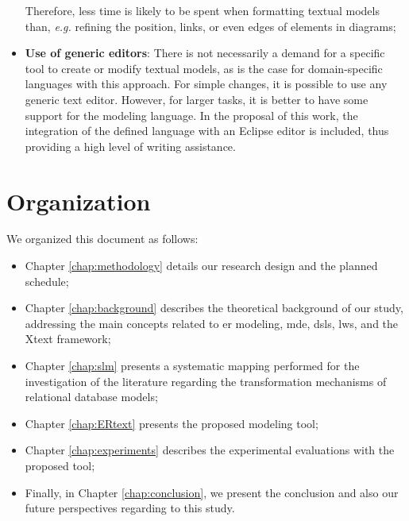 \begin{itemize}
    Therefore, less time is likely to be spent when formatting textual models than, \textit{e.g.} refining the position, links, or even edges of elements in diagrams;
    \item \textbf{Use of generic editors}: 
    There is not necessarily a demand for a specific tool to create or modify textual models, as is the case for domain-specific languages with this approach.
    For simple changes, it is possible to use any generic text editor.
    However, for larger tasks, it is better to have some support for the modeling language.
    In the proposal of this work, the integration of the defined language with an Eclipse editor is included, thus providing a high level of writing assistance.
\end{itemize}

\section{Organization}

We organized this document as follows:

\begin{itemize}
    \item Chapter \ref{chap:methodology} details our research design and the planned schedule;
    \item Chapter \ref{chap:background} describes the theoretical background of our study, addressing the main concepts related to \ac{er} modeling, \ac{mde}, \acp{dsl}, \acp{lw}, and the Xtext framework;
    \item Chapter \ref{chap:slm} presents a systematic mapping performed for the investigation of the literature regarding the transformation mechanisms of relational database models;
    \item Chapter \ref{chap:ERtext} presents the proposed modeling tool;
    \item Chapter \ref{chap:experiments} describes the experimental evaluations with the proposed tool;
    \item Finally, in Chapter \ref{chap:conclusion}, we present the conclusion and also our future perspectives regarding to this study.
\end{itemize}



